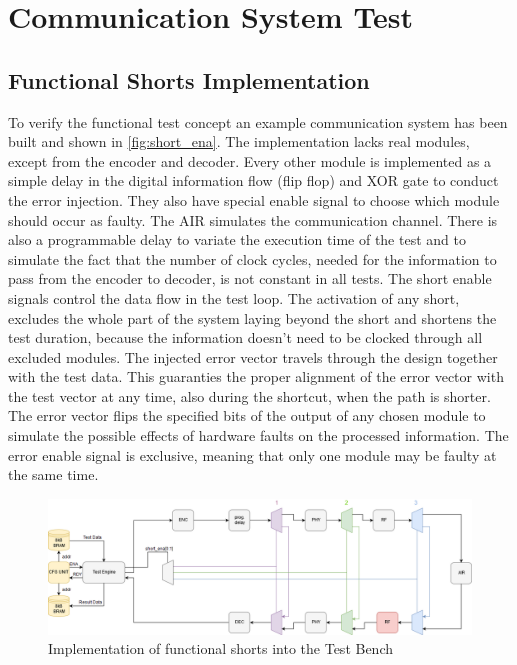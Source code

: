 \chapter{Communication System Test}\label{ch:experiment}

\section{Functional Shorts Implementation}
To verify the functional test concept an example communication system has been built and shown in \autoref{fig:short_ena}. The implementation lacks real modules, except from the encoder and decoder. Every other module is implemented as a simple delay in the digital information flow (flip flop) and XOR gate to conduct the error injection. They also have special enable signal to choose which module should occur as faulty. The AIR simulates the communication channel. There is also a programmable delay to variate the execution time of the test and to simulate the fact that the number of clock cycles, needed for the information to pass from the encoder to decoder, is not constant in all tests. The short enable signals control the data flow in the test loop. The activation of any short, excludes the whole part of the system laying beyond the short and shortens the test duration, because the information doesn't need to be clocked through all excluded modules. The injected error vector travels through the design together with the test data. This guaranties the proper alignment of the error vector with the test vector at any time, also during the shortcut, when the path is shorter. The error vector flips the specified bits of the output of any chosen module to simulate the possible effects of hardware faults on the processed information. The error enable signal is exclusive, meaning that only one module may be faulty at the same time. 

\begin{figure}[h]
\centering
\includegraphics[width=\textwidth]{figures/Short_ena_err.png}
\caption{Implementation of functional shorts into the Test Bench}
\label{fig:short_ena}
\end{figure}

